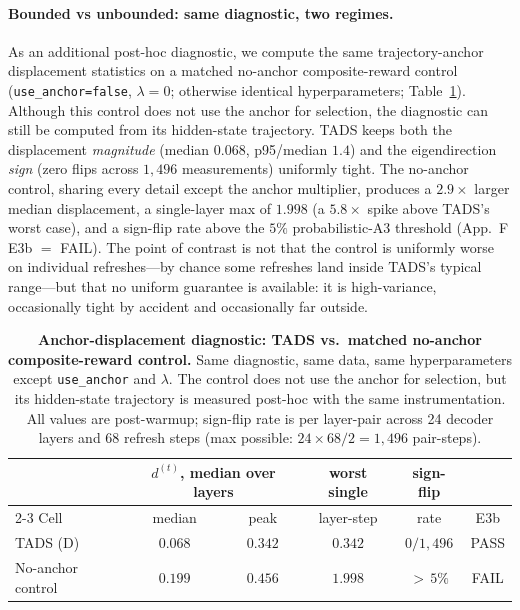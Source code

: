 \paragraph{Bounded vs unbounded: same diagnostic, two regimes.}
As an additional post-hoc diagnostic, we compute the same
trajectory-anchor displacement statistics on a matched no-anchor
composite-reward control (\texttt{use\_anchor=false}, $\lambda=0$;
otherwise identical hyperparameters; Table~\ref{tab:dstep-spread}).
Although this control does not use the anchor for selection, the
diagnostic can still be computed from its hidden-state trajectory.
\textsc{TADS} keeps both the displacement \emph{magnitude} (median
$0.068$, p95/median $1.4$) and the eigendirection \emph{sign} (zero
flips across $1{,}496$ measurements) uniformly tight. The no-anchor
control, sharing every detail except the anchor multiplier, produces
a $2.9\times$ larger median displacement, a single-layer max of
$1.998$ (a $5.8\times$ spike above \textsc{TADS}'s worst case), and
a sign-flip rate above the $5\%$ probabilistic-A3 threshold
(App.~F E3b $=$ FAIL). The point of contrast is not that the control
is uniformly worse on individual refreshes---by chance some
refreshes land inside \textsc{TADS}'s typical range---but that no
uniform guarantee is available: it is high-variance, occasionally
tight by accident and occasionally far outside.
\begin{table}[t]
\centering
\caption{\textbf{Anchor-displacement diagnostic: \textsc{TADS} vs.\
matched no-anchor composite-reward control.} Same diagnostic, same
data, same hyperparameters except \texttt{use\_anchor} and $\lambda$.
The control does not use the anchor for selection, but its
hidden-state trajectory is measured post-hoc with the same
instrumentation. All values are post-warmup; sign-flip rate is per
layer-pair across 24 decoder layers and 68 refresh steps (max
possible: $24 \times 68 / 2 = 1{,}496$ pair-steps).}
\label{tab:dstep-spread}
\small
\setlength{\tabcolsep}{5pt}
\begin{tabular}{@{}lccccc@{}}
\toprule
 & \multicolumn{2}{c}{$d^{(t)}$, median over layers} & worst single & sign-flip & \\
\cmidrule(lr){2-3}
Cell & median & peak & layer-step & rate & E3b \\
\midrule
\textsc{TADS} (D)        & $0.068$ & $0.342$ & $0.342$ & $0 / 1{,}496$ & PASS \\
No-anchor control        & $0.199$ & $0.456$ & $1.998$ & ${>}\,5\%$    & FAIL \\
\bottomrule
\end{tabular}
\end{table}

